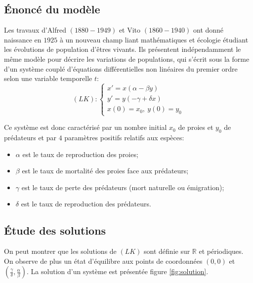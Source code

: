 \documentclass[11pt]{article}
\newcommand{\ensemble}[1]{\mathbb{#1}}
\newcommand{\R}{\ensemble{R}}
\begin{document}
\subsection{Énoncé du modèle}

Les travaux d'Alfred  $(1880-1949)$ et Vito  $(1860-1940)$ ont donné naissance en $1925$ à un nouveau champ liant mathématiques et écologie étudiant les évolutions de population d'êtres vivants. Ils présentent indépendamment le même modèle pour décrire les variations de populations, qui s'écrit sous la forme d'un système couplé d'équations différentielles non linéaires du premier ordre selon une variable temporelle $t$:
\[(LK): \begin{cases}
x' = x (\alpha - \beta y )\\
y' = y (- \gamma + \delta x )\\
x(0) = x_0,\ y(0) = y_0
\end{cases}\]

Ce système est donc caractérisé par un nombre initial $x_0$ de proies et $y_0$ de prédateurs et par $4$ paramètres positifs relatifs aux espèces:
\begin{itemize}[label=\textbullet]
    \item $\alpha$ est le taux de reproduction des proies;
    \item $\beta$ est le taux de mortalité des proies face aux prédateurs;
    \item $\gamma$ est le taux de perte des prédateurs (mort naturelle ou émigration);
    \item $\delta$ est le taux de reproduction des prédateurs.
\end{itemize}

\subsection{Étude des solutions}

On peut montrer que les solutions de $(LK)$ sont définie sur $\R$ et périodiques. On observe de plus un état d'équilibre aux points de coordonnées $(0, 0)$ et $\left( \frac{\gamma}{\delta}, \frac{\alpha}{\beta} \right)$. La solution d'un système est présentée figure \ref{fig:solution}.
\end{document}
